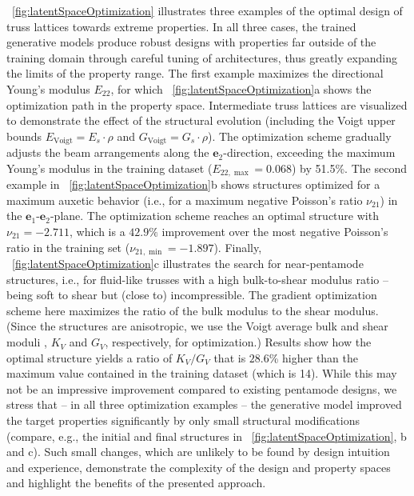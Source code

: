 \documentclass[fleqn,10pt]{wlscirep}
\newcommand{\boldface}[1]{\boldsymbol{#1}}
\newcommand{\bfe}{\boldface{e}}
\begin{document}
\figureautorefname~\ref{fig:latentSpaceOptimization} illustrates three examples of the optimal design of truss lattices towards extreme properties. In all three cases, the trained generative models produce robust designs with properties far outside of the training domain through careful tuning of architectures, thus greatly expanding the limits of the property range.
The first example maximizes the directional Young's modulus $E_{22}$, for which \figureautorefname~\ref{fig:latentSpaceOptimization}a shows the optimization path in the property space. Intermediate truss lattices are visualized to demonstrate the effect of the structural evolution (including the Voigt upper bounds $E_{\text{Voigt}} = E_s \cdot \rho$ and $G_{\text{Voigt}} = G_s \cdot \rho$). The optimization scheme gradually adjusts the beam arrangements along the $\bfe_2$-direction, exceeding the maximum Young's modulus in the training dataset ($E_{22,\max} = 0.068$) by 51.5\%. The second example in \figureautorefname~\ref{fig:latentSpaceOptimization}b shows structures optimized for a maximum auxetic behavior (i.e., for a maximum negative Poisson's ratio $\nu_{21}$) in the $\bfe_1$-$\bfe_2$-plane. The optimization scheme reaches an optimal structure with $\nu_{21} = -2.711$, which is a $42.9\% $ improvement over the most negative Poisson's ratio in the training set ($\nu_{21,\min} = -1.897$). Finally, \figureautorefname~\ref{fig:latentSpaceOptimization}c illustrates the search for near-pentamode structures\cite{MiltonCherkaev1995}, i.e., for fluid-like trusses with a high bulk-to-shear modulus ratio -- being soft to shear but (close to) incompressible. The gradient optimization scheme here maximizes the ratio of the bulk modulus to the shear modulus. (Since the structures are anisotropic, we use the Voigt average bulk and shear moduli \cite{voigt1910lehrbuch}, $K_V$ and $G_V$, respectively, for optimization.) Results show how the optimal structure yields a ratio of $K_V/G_V$ that is $28.6$\% higher than the maximum value contained in the training dataset (which is 14). While this may not be an impressive improvement compared to existing pentamode designs, we stress that -- in all three optimization examples -- the generative model improved the target properties significantly by only small structural modifications (compare, e.g., the initial and final structures in \figureautorefname~\ref{fig:latentSpaceOptimization}, b and c). Such small changes, which are unlikely to be found by design intuition and experience, demonstrate the complexity of the design and property spaces and highlight the benefits of the presented approach.
\end{document}
